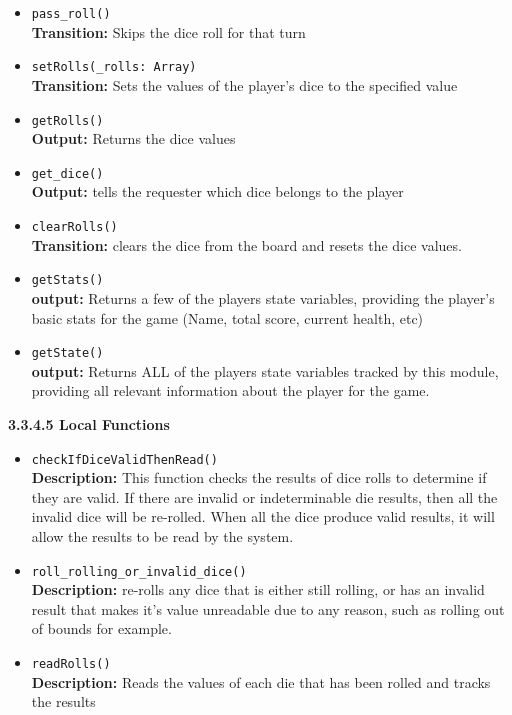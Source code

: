 \documentclass[12pt, titlepage]{article}
\begin{document}
\begin{itemize}
    \item \texttt{pass\_roll()}\\
    \textbf{Transition:} Skips the dice roll for that turn
    
    \item \texttt{setRolls(\_rolls: Array)}\\
	\textbf{Transition:} Sets the values of the player's dice to the specified value
    
    \item \texttt{getRolls()}\\
    	\textbf{Output:} Returns the dice values 
    
    \item \texttt{get\_dice()}\\
    	\textbf{Output:} tells the requester which dice belongs to the player
    	
    \item \texttt{clearRolls()}\\
    	\textbf{Transition:} clears the dice from the board and resets the dice values.
    	
    \item \texttt{getStats()}\\
    	\textbf{output:} Returns a few of the players state variables, providing the player's basic stats for the game (Name, total score, current health, etc)
    	
    \item \texttt{getState()}\\
    	\textbf{output:} Returns ALL of the players state variables tracked by this module, providing all relevant information about the player for the game.

\end{itemize}

\textbf{3.3.4.5 Local Functions}
\begin{itemize}
    
    \item \texttt{checkIfDiceValidThenRead()}\\
    \textbf{Description:} This function checks the results of dice rolls to determine if they are valid. If there are invalid or indeterminable die results, then all the invalid dice will be re-rolled. When all the dice produce valid results, it will allow the results to be read by the system.
    
    \item \texttt{roll\_rolling\_or\_invalid\_dice()}\\
    	\textbf{Description:} re-rolls any dice that is either still rolling, or has an invalid result that makes it's value unreadable due to any reason, such as rolling out of bounds for example.    
    
    \item \texttt{readRolls()}\\
    \textbf{Description:} Reads the values of each die that has been rolled and tracks the results
    
\end{itemize}
\end{document}
